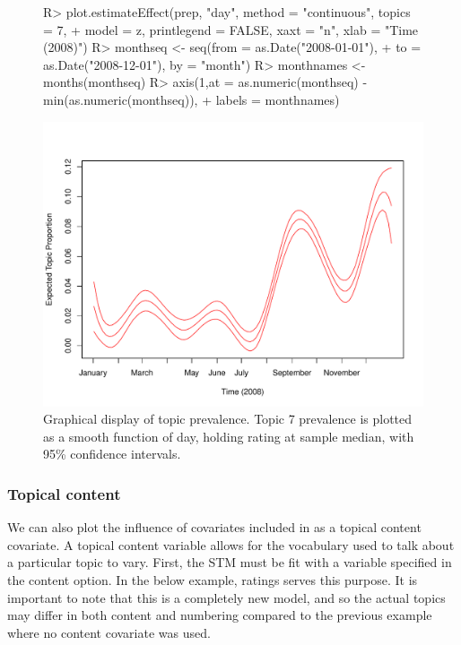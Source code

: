 \documentclass[article,shortnames]{jss}
\begin{document}
\begin{figure}
\begin{center}
\begin{Schunk}
\begin{Sinput}
R> plot.estimateEffect(prep, "day", method = "continuous", topics = 7,
+  model = z, printlegend = FALSE, xaxt = "n", xlab = "Time (2008)")
R> monthseq <- seq(from = as.Date("2008-01-01"), 
+  to = as.Date("2008-12-01"), by = "month")
R> monthnames <- months(monthseq)
R> axis(1,at = as.numeric(monthseq) - min(as.numeric(monthseq)), 
+  labels = monthnames)
\end{Sinput}
\end{Schunk}
\includegraphics{stmVignette-018}
\caption{Graphical display of topic prevalence. Topic 7 prevalence is plotted as a smooth function of day, holding rating at sample median, with 95\% confidence intervals.}
\label{fig:spline}
\end{center}
\end{figure}


\subsubsection{Topical content}

We can also plot the influence of covariates included in as a topical content covariate. A topical content variable allows for the vocabulary used to talk about a particular topic to vary. First, the STM must be fit with a variable specified in the content option. In the below example, ratings serves this purpose. It is important to note that this is a completely new model, and so the actual topics may differ in both content and numbering compared to the previous example where no content covariate was used.
\end{document}
